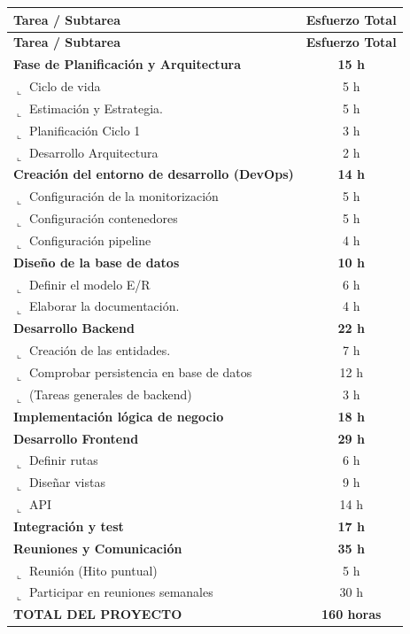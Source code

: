 \documentclass[12pt,a4paper,titlepage]{article}
\begin{document}
\begin{longtable}{@{}lc@{}}
    \toprule
    \textbf{Tarea / Subtarea} & \textbf{Esfuerzo Total} \\ \midrule
    \endfirsthead
    \toprule
    \textbf{Tarea / Subtarea} & \textbf{Esfuerzo Total} \\ \midrule
    \endhead
    \bottomrule
    \endfoot
    \bottomrule
    \endlastfoot

    \textbf{Fase de Planificación y Arquitectura} & \textbf{15 h} \\
    $\llcorner$ Ciclo de vida & 5 h \\
    $\llcorner$ Estimación y Estrategia. & 5 h \\
    $\llcorner$ Planificación Ciclo 1 & 3 h \\
    $\llcorner$ Desarrollo Arquitectura & 2 h \\ \addlinespace

    \textbf{Creación del entorno de desarrollo (DevOps)} & \textbf{14 h} \\
    $\llcorner$ Configuración de la monitorización & 5 h \\
    $\llcorner$ Configuración contenedores & 5 h \\
    $\llcorner$ Configuración pipeline & 4 h \\ \addlinespace

    \textbf{Diseño de la base de datos} & \textbf{10 h} \\
    $\llcorner$ Definir el modelo E/R & 6 h \\
    $\llcorner$ Elaborar la documentación. & 4 h \\ \addlinespace

    \textbf{Desarrollo Backend} & \textbf{22 h} \\
    $\llcorner$ Creación de las entidades. & 7 h \\
    $\llcorner$ Comprobar persistencia en base de datos & 12 h \\ 
    $\llcorner$ (Tareas generales de backend) & 3 h \\ \addlinespace

    \textbf{Implementación lógica de negocio} & \textbf{18 h} \\ \addlinespace

    \textbf{Desarrollo Frontend} & \textbf{29 h} \\
    $\llcorner$ Definir rutas & 6 h \\
    $\llcorner$ Diseñar vistas & 9 h \\
    $\llcorner$ API & 14 h \\ \addlinespace

    \textbf{Integración y test} & \textbf{17 h} \\ \addlinespace
    
    \textbf{Reuniones y Comunicación} & \textbf{35 h} \\
    $\llcorner$ Reunión (Hito puntual) & 5 h \\
    $\llcorner$ Participar en reuniones semanales & 30 h \\ \midrule
    
    \textbf{TOTAL DEL PROYECTO} & \textbf{160 horas} \\
\end{longtable}
\end{document}
